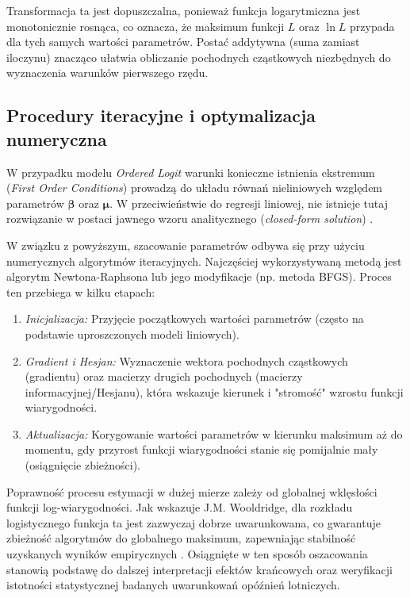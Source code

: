 Transformacja ta jest dopuszczalna, ponieważ funkcja logarytmiczna jest monotonicznie rosnąca, co oznacza, że maksimum funkcji $L$ oraz $\ln L$ przypada dla tych samych wartości parametrów. Postać addytywna (suma zamiast iloczynu) znacząco ułatwia obliczanie pochodnych cząstkowych niezbędnych do wyznaczenia warunków pierwszego rzędu.



\subsection{Procedury iteracyjne i optymalizacja numeryczna}

W przypadku modelu \textit{Ordered Logit} warunki konieczne istnienia ekstremum (\textit{First Order Conditions}) prowadzą do układu równań nieliniowych względem parametrów $\boldsymbol{\beta}$ oraz $\boldsymbol{\mu}$. W przeciwieństwie do regresji liniowej, nie istnieje tutaj rozwiązanie w postaci jawnego wzoru analitycznego (\textit{closed-form solution}) \cite{maddala1983}.

W związku z powyższym, szacowanie parametrów odbywa się przy użyciu numerycznych algorytmów iteracyjnych. Najczęściej wykorzystywaną metodą jest algorytm Newtona-Raphsona lub jego modyfikacje (np. metoda BFGS). Proces ten przebiega w kilku etapach:
\begin{enumerate}
    \item \textit{Inicjalizacja:} Przyjęcie początkowych wartości parametrów (często na podstawie uproszczonych modeli liniowych).
    \item \textit{Gradient i Hesjan:} Wyznaczenie wektora pochodnych cząstkowych (gradientu) oraz macierzy drugich pochodnych (macierzy informacyjnej/Hesjanu), która wskazuje kierunek i "stromość" wzrostu funkcji wiarygodności.
    \item \textit{Aktualizacja:} Korygowanie wartości parametrów w kierunku maksimum aż do momentu, gdy przyrost funkcji wiarygodności stanie się pomijalnie mały (osiągnięcie zbieżności).
\end{enumerate}

Poprawność procesu estymacji w dużej mierze zależy od globalnej wklęsłości funkcji log-wiarygodności. Jak wskazuje J.M. Wooldridge, dla rozkładu logistycznego funkcja ta jest zazwyczaj dobrze uwarunkowana, co gwarantuje zbieżność algorytmów do globalnego maksimum, zapewniając stabilność uzyskanych wyników empirycznych \cite{jackowska2011}. Osiągnięte w ten sposób oszacowania stanowią podstawę do dalszej interpretacji efektów krańcowych oraz weryfikacji istotności statystycznej badanych uwarunkowań opóźnień lotniczych.

